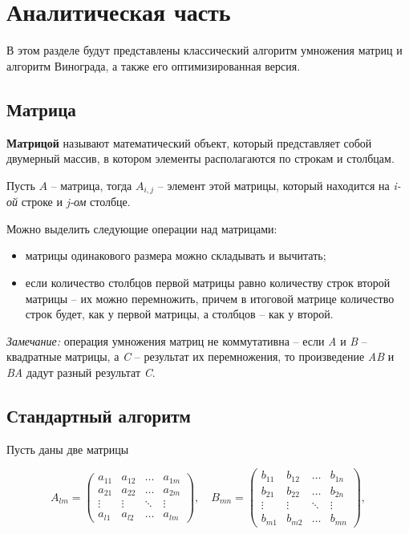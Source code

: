 \chapter{Аналитическая часть}
В этом разделе будут представлены классический алгоритм умножения матриц и алгоритм Винограда, а также его оптимизированная версия.


\section{Матрица}

\textbf{Матрицой} \cite{matrix} называют математический объект, который представляет собой двумерный массив, в котором элементы располагаются по строкам и столбцам.

Пусть $A$ -- матрица, тогда $A_{i,j}$ -- элемент этой матрицы, который находится на \textit{i-ой} строке и \textit{j-ом} столбце.

Можно выделить следующие операции над матрицами:
\begin{itemize}
    \item матрицы одинакового размера можно складывать и вычитать;
    \item если количество столбцов первой матрицы равно количеству строк второй матрицы -- их можно перемножить, причем в итоговой матрице количество строк будет, как у первой матрицы, а столбцов -- как у второй. \newline
\end{itemize}

\textit{Замечание:} операция умножения матриц не коммутативна -- если \textit{A} и \textit{B} -- квадратные матрицы, а \textit{C} -- результат их перемножения, то произведение \textit{AB} и \textit{BA} дадут разный результат \textit{C}.


\section{Стандартный алгоритм}

Пусть даны две матрицы

\begin{equation}
	A_{lm} = \begin{pmatrix}
		a_{11} & a_{12} & \ldots & a_{1m}\\
		a_{21} & a_{22} & \ldots & a_{2m}\\
		\vdots & \vdots & \ddots & \vdots\\
		a_{l1} & a_{l2} & \ldots & a_{lm}
	\end{pmatrix},
	\quad
	B_{mn} = \begin{pmatrix}
		b_{11} & b_{12} & \ldots & b_{1n}\\
		b_{21} & b_{22} & \ldots & b_{2n}\\
		\vdots & \vdots & \ddots & \vdots\\
		b_{m1} & b_{m2} & \ldots & b_{mn}
	\end{pmatrix},
\end{equation}

